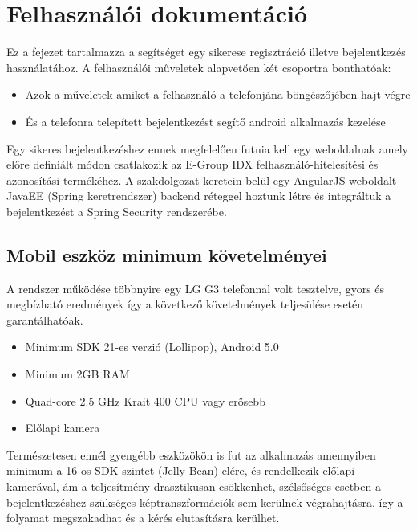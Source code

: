 \section{Felhasználói dokumentáció}
Ez a fejezet tartalmazza a segítséget egy sikerese regisztráció illetve bejelentkezés használatához. A felhasználói műveletek alapvetően két csoportra bonthatóak:
\begin{itemize}
\item Azok a műveletek amiket a felhasználó a telefonjána böngészőjében hajt végre
\item És a telefonra telepített bejelentkezést segítő android alkalmazás kezelése
\end{itemize}

Egy sikeres bejelentkezéshez ennek megfelelően futnia kell egy weboldalnak amely előre definiált módon csatlakozik az E-Group IDX felhasználó-hitelesítési és azonosítási termékéhez.
A szakdolgozat keretein belül egy AngularJS weboldalt JavaEE (Spring keretrendszer) backend réteggel hoztunk létre és integráltuk a bejelentkezést a Spring Security rendszerébe.

\subsection{Mobil eszköz minimum követelményei}
A rendszer működése többnyire egy LG G3 telefonnal volt tesztelve, gyors és megbízható eredmények így a következő követelmények teljesülése esetén garantálhatóak.
\begin{itemize}
\item Minimum SDK 21-es verzió (Lollipop), Android 5.0
\item Minimum 2GB RAM
\item Quad-core 2.5 GHz Krait 400 CPU vagy erősebb
\item Előlapi kamera
\end{itemize}

Természetesen ennél gyengébb eszközökön is fut az alkalmazás amennyiben minimum a 16-os SDK szintet (Jelly Bean) elére, és rendelkezik előlapi kamerával, ám a teljesítmény drasztikusan csökkenhet, szélsőséges esetben a bejelentkezéshez szükséges képtranszformációk sem kerülnek végrahajtásra, így a folyamat megszakadhat és a kérés elutasításra kerülhet.

